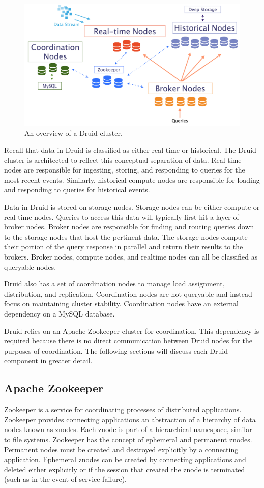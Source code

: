 \documentclass{vldb}
\begin{document}
\begin{figure}
\centering
\includegraphics[width = 5.2in]{druid_cluster}
\caption{An overview of a Druid cluster.}
\label{fig:druid_cluster}
\end{figure}

Recall that data in Druid is classified as either real-time or
historical. The Druid cluster is architected to reflect this
conceptual separation of data. Real-time nodes are responsible for
ingesting, storing, and responding to queries for the most recent
events. Similarly, historical compute nodes are responsible for
loading and responding to queries for historical events.

Data in Druid is stored on storage nodes. Storage nodes can be either
compute or real-time nodes.  Queries to access this data will
typically first hit a layer of broker nodes. Broker nodes are
responsible for finding and routing queries down to the storage nodes
that host the pertinent data. The storage nodes compute their portion
of the query response in parallel and return their results to the
brokers. Broker nodes, compute nodes, and realtime nodes can all be
classified as queryable nodes.

Druid also has a set of coordination nodes to manage load assignment,
distribution, and replication. Coordination nodes are not queryable
and instead focus on maintaining cluster stability. Coordination nodes
have an external dependency on a MySQL database.

Druid relies on an Apache Zookeeper \cite{hunt2010zookeeper} cluster
for coordination. This dependency is required because there is no
direct communication between Druid nodes for the purposes of coordination. The
following sections will discuss each Druid component in greater
detail.

\subsection{Apache Zookeeper}
Zookeeper is a service for coordinating processes of distributed
applications. Zookeeper provides connecting applications an
abstraction of a hierarchy of data nodes known as znodes. Each znode
is part of a hierarchical namespace, similar to file
systems. Zookeeper has the concept of ephemeral and permanent
znodes. Permanent nodes must be created and destroyed explicitly by a
connecting application. Ephemeral znodes can be created by connecting
applications and deleted either explicitly or if the session that
created the znode is terminated (such as in the event of service
failure).
\end{document}
